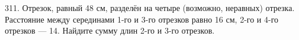 311. Отрезок, равный 48 см, разделён на четыре (возможно, неравных) отрезка. Расстояние между серединами 1-го и 3-го отрезков равно 16 см, 2-го и 4-го отрезков --- 14. Найдите сумму длин 2-го и 3-го отрезков.\\

